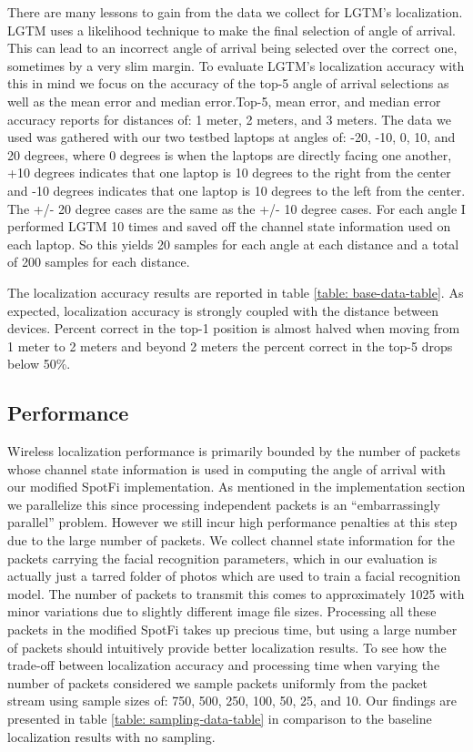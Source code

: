 \documentclass[12pt]{report}
\begin{document}
There are many lessons to gain from the data we collect for LGTM's localization. LGTM uses a likelihood technique to make the final selection of angle of arrival. This can lead to an incorrect angle of arrival being selected over the correct one, sometimes by a very slim margin. To evaluate LGTM's localization accuracy with this in mind we focus on the accuracy of the top-5 angle of arrival selections as well as the mean error and median error.Top-5, mean error, and median error accuracy reports for distances of: 1 meter, 2 meters, and 3 meters. The data we used was gathered with our two testbed laptops at angles of: -20, -10, 0, 10, and 20 degrees, where 0 degrees is when the laptops are directly facing one another, +10 degrees indicates that one laptop is 10 degrees to the right from the center and -10 degrees indicates that one laptop is 10 degrees to the left from the center. The +/- 20 degree cases are the same as the +/- 10 degree cases. For each angle I performed LGTM 10 times and saved off the channel state information used on each laptop. So this yields 20 samples for each angle at each distance and a total of 200 samples for each distance. \par 

The localization accuracy results are reported in table \ref{table: base-data-table}. As expected, localization accuracy is strongly coupled with the distance between devices. Percent correct in the top-1 position is almost halved when moving from 1 meter to 2 meters and beyond 2 meters the percent correct in the top-5 drops below 50\%. \par

\subsection{Performance}
Wireless localization performance is primarily bounded by the number of packets whose channel state information is used in computing the angle of arrival with our modified SpotFi implementation. As mentioned in the implementation section we parallelize this since processing independent packets is an ``embarrassingly parallel'' problem. However we still incur high performance penalties at this step due to the large number of packets. We collect channel state information for the packets carrying the facial recognition parameters, which in our evaluation is actually just a tarred folder of photos which are used to train a facial recognition model. The number of packets to transmit this comes to approximately 1025 with minor variations due to slightly different image file sizes. Processing all these packets in the modified SpotFi takes up precious time, but using a large number of packets should intuitively provide better localization results. To see how the trade-off between localization accuracy and processing time when varying the number of packets considered we sample packets uniformly from the packet stream using sample sizes of: 750, 500, 250, 100, 50, 25, and 10. Our findings are presented in table \ref{table: sampling-data-table} in comparison to the baseline localization results with no sampling. \par
\end{document}
